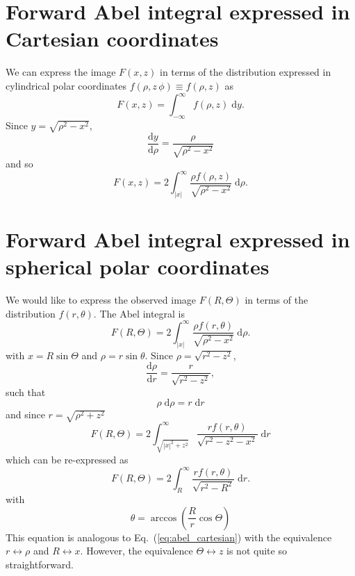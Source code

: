 \documentclass{article}
\renewcommand{\eqref}[1]{Eq.~(\ref{#1})}
\newcommand{\dee}{\ensuremath{\mathrm{d}}}
\begin{document}
\section{Forward Abel integral expressed in Cartesian coordinates}
We can express the image $F(x,z)$ in terms of the distribution expressed in
cylindrical polar coordinates $f(\rho,z\, \phi)\equiv f(\rho, z)$ as 
\begin{equation}
  F(x,z)=\int_{-\infty}^{\infty}
  f(\rho, z)\;\dee{y}.
\end{equation}
Since $y=\sqrt{\rho^2-x^2}$,
\begin{equation}
  \frac{\dee{y}}{\dee{\rho}}
  =\frac{\rho}{\sqrt{\rho^2-x^2}}
\end{equation}
and so
\begin{equation}
  \label{eq:abel_cartesian}
  F(x,z)=2\int_{|x|}^{\infty}
  \frac{\rho f(\rho, z)}{\sqrt{\rho^2-x^2}}
  \;\dee\rho.
\end{equation}

\section{Forward Abel integral expressed in spherical polar coordinates} 
We would like to express the observed image $F(R, \Theta)$ in terms of the
distribution $f(r, \theta)$. The Abel integral is
\begin{equation}
  F(R, \Theta)=2\int_{|x|}^\infty
  \frac{\rho f(r, \theta)}{\sqrt{\rho^2-x^2}}\;\dee \rho.
\end{equation}
with $x=R\sin\Theta$ and $\rho=r\sin\theta$. Since $\rho=\sqrt{r^2-z^2}$,
\begin{equation}
  \frac{\dee \rho}{\dee r}=
  \frac{r}{\sqrt{r^2-z^2}},
\end{equation}
such that
\begin{equation}
  \rho\;\dee \rho=r\;\dee r
\end{equation}
and since $r=\sqrt{\rho^2+z^2}$
\begin{equation}
  F(R, \Theta)=
  2\int_{\sqrt{|x|^2+z^2}}^\infty
  \frac{rf(r, \theta)}{\sqrt{r^2-z^2-x^2}}\;\dee r
\end{equation}
which can be re-expressed as
\begin{equation}
  \label{eq:abel_polar}
  F(R, \Theta)=
  2\int_{R}^\infty
  \frac{rf(r, \theta)}{\sqrt{r^2-R^2}}\;\dee r.
\end{equation}
with 
\begin{equation}
  \theta=\arccos\left(
    \frac{R}{r}\cos\Theta
  \right)
\end{equation}
This equation is analogous to \eqref{eq:abel_cartesian} with the equivalence
$r\leftrightarrow\rho$ and $R\leftrightarrow x$. However, the equivalence
$\Theta\leftrightarrow z$ is not quite so straightforward.
\end{document}

